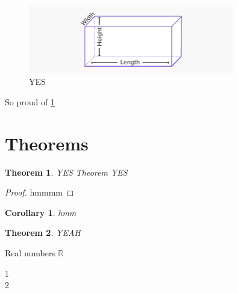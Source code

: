 \documentclass{article}
\newtheorem{theorem}{Theorem}[section]
\newtheorem{corollary}{Corollary}[theorem]
\newcommand{\R}{\mathbb{R}}
\newcommand{\cv}[2]{
    \begin{bmatrix}
        #1\\
        #2\\
    \end{bmatrix}
}
\begin{document}
\begin{figure}
    \centering
    \includegraphics[width=0.8\textwidth]{length.png}
    \caption{YES}
    \label{YES}
\end{figure}

So proud of \ref{YES}

\section{Theorems}
\begin{theorem}{YES Theorem}
YES 
\end{theorem}
\begin{proof}
   hmmmm 
\end{proof}

\begin{corollary}
   hmm 
\end{corollary}

\begin{theorem}
YEAH
\end{theorem}

Real numbers $\R$
\cv{1}{2}
\end{document}
